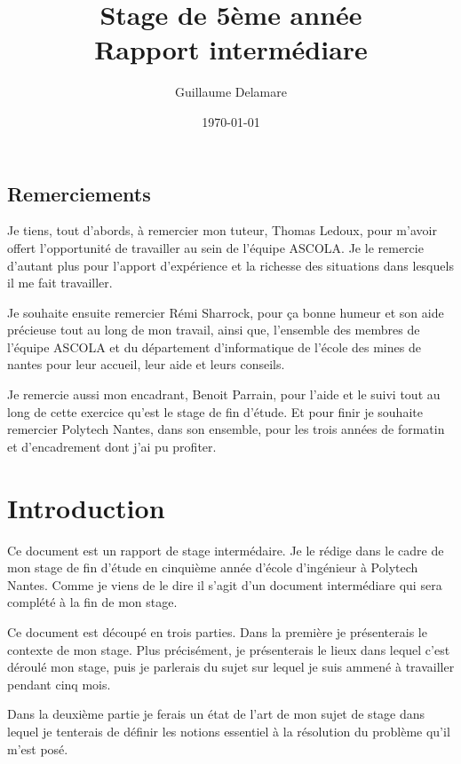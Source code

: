 \documentclass[a4paper, 11pt]{report}
\title{Stage de 5ème année\\ \large Rapport intermédiare}
\author{Guillaume Delamare}
\date{\today}
\begin{document}
\renewcommand{\labelitemi}{$\bullet$}
\renewcommand{\labelitemii}{$\diamond$}
\renewcommand{\labelitemiii}{$\ast$}
\renewcommand{\labelitemiv}{$\cdot$}

\maketitle

\section*{Remerciements}
Je tiens, tout d'abords, à remercier mon tuteur, Thomas Ledoux, pour m'avoir offert l'opportunité de travailler au sein de l'équipe ASCOLA. Je le remercie d'autant plus pour l'apport d'expérience et la richesse des situations dans lesquels il me fait travailler.

Je souhaite ensuite remercier Rémi Sharrock, pour ça bonne humeur et son aide précieuse tout au long de mon travail, ainsi que, l'ensemble des membres de l'équipe ASCOLA et du département d'informatique de l'école des mines de nantes pour leur accueil, leur aide et leurs conseils.

Je remercie aussi mon encadrant, Benoit Parrain, pour l'aide et le suivi tout au long de cette exercice qu'est le stage de fin d'étude. Et pour finir je souhaite remercier Polytech Nantes, dans son ensemble, pour les trois années de formatin et d'encadrement dont j'ai pu profiter.

\newpage

\tableofcontents



\chapter{Introduction}
Ce document est un rapport de stage intermédaire. Je le rédige dans le cadre de mon stage de fin d'étude en cinquième année d'école d'ingénieur à Polytech Nantes. Comme je viens de le dire il s'agit d'un document intermédiare qui sera complété à la fin de mon stage. 

Ce document est découpé en trois parties. Dans la première je présenterais le contexte de mon stage. Plus précisément, je présenterais le lieux dans lequel c'est déroulé mon stage, puis je parlerais du sujet sur lequel je suis ammené à travailler pendant cinq mois.

Dans la deuxième partie je ferais un état de l'art de mon sujet de stage dans lequel je tenterais de définir les notions essentiel à la résolution du problème qu'il m'est posé.
\end{document}

